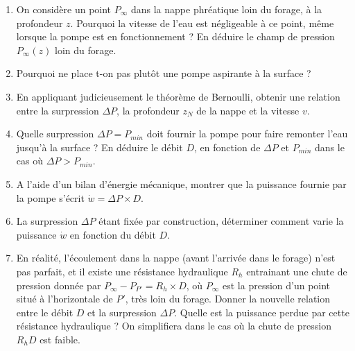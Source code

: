 \begin{enumerate}

	\item On considère un point $P_\infty$ dans la nappe phréatique loin du forage, à la profondeur $z$. Pourquoi la vitesse de l'eau est négligeable à ce point, même lorsque la pompe est en fonctionnement ? En déduire le champ de pression $P_\infty(z)$ loin du forage.

	\item Pourquoi ne place t-on pas plutôt une pompe aspirante à la surface ?
	
	\item En appliquant judicieusement le théorème de Bernoulli, obtenir une relation entre la surpression $\Delta P$, la profondeur $z_N$ de la nappe et la vitesse $v$. 
	
	\item Quelle surpression $\Delta P =P_{min}$ doit fournir la pompe pour faire remonter l'eau jusqu'à la surface ? En déduire le débit $D$, en fonction de $\Delta P$ et $P_{min}$ dans le cas où $\Delta P >P_{min}$.
	
	\item A l'aide d'un bilan d'énergie mécanique, montrer que la puissance fournie par la pompe s'écrit $\dot{w}=\Delta P\times D$. 
	
	\item La surpression $\Delta P$ étant fixée par construction, déterminer comment varie la puissance $\dot{w}$ en fonction du débit $D$.
	
	\item En réalité, l'écoulement dans la nappe (avant l'arrivée dans le forage) n'est pas parfait, et il existe une résistance hydraulique $R_h$ entrainant une chute de pression donnée par $P_\infty-P_{P'}=R_h\times D$, où $P_\infty$ est la pression d'un point situé à l'horizontale de $P'$, très loin du forage. Donner la nouvelle relation entre le débit $D$ et la surpression $\Delta P$. Quelle est la puissance perdue par cette résistance hydraulique ? On simplifiera dans le cas où la chute de pression $R_hD$ est faible. 

\end{enumerate}

\newpage

